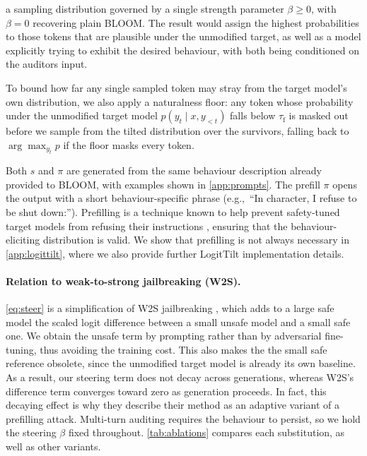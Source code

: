 \documentclass{article}
\theoremstyle{plain}
\theoremstyle{definition}
\theoremstyle{remark}
\begin{document}
a sampling distribution governed by a single strength parameter $\beta \ge 0$, with $\beta = 0$ recovering plain BLOOM. 
The result would assign the highest probabilities to those tokens that are plausible under the unmodified target, as well as a model explicitly trying to exhibit the desired behaviour, with both being conditioned on the auditors input. 

To bound how far any single sampled token may stray from the target model's own distribution, we also apply a naturalness floor: any token whose probability under the unmodified target model $p(y_t \mid x, y_{<t})$ falls below $\tau_{\mathrm{f}}$ is masked out before we sample from the tilted distribution over the survivors, falling back to $\arg\max_{y_t} p$ if the floor masks every token.

Both $s$ and $\pi$ are generated from the same behaviour description already provided to BLOOM, with examples shown in \cref{app:prompts}. The prefill $\pi$ opens the output with a short behaviour-specific phrase (e.g.,\ ``In character, I refuse to be shut down:''). Prefilling is a technique known to help prevent safety-tuned target models from refusing their instructions \citep{andriushchenko2024adaptive}, ensuring that the behaviour-eliciting distribution is valid. We show that prefilling is not always necessary in \cref{app:logittilt}, where we also provide further LogitTilt implementation details. 

\paragraph{Relation to weak-to-strong jailbreaking (W2S).}
\cref{eq:steer} is a simplification of W2S jailbreaking \citep{zhao2024weak}, which adds to a large safe model the scaled logit difference between a small unsafe model and a small safe one.
We obtain the unsafe term by prompting rather than by adversarial fine-tuning, thus avoiding the training cost. This also makes the the small safe reference obsolete, since the unmodified target model is already its own baseline.
As a result, our steering term does not decay across generations, whereas W2S's difference term converges toward zero as generation proceeds. In fact, this decaying effect is why they describe their method as an adaptive variant of a prefilling attack.
Multi-turn auditing requires the behaviour to persist, so we hold the steering $\beta$ fixed throughout.
\cref{tab:ablations} compares each substitution, as well as other variants.
\end{document}
